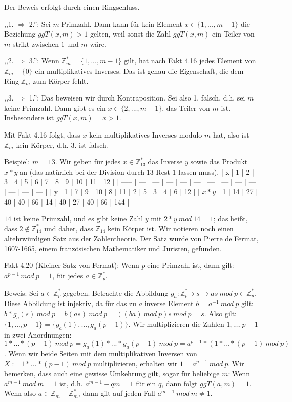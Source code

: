 \documentclass[a4paper]{article}
\begin{document}
\begin{multicols}{3}
    Der Beweis erfolgt durch einen Ringschluss.
    \begin{itemize*}
        \item ,,1. $\Rightarrow$ 2.'': Sei $m$ Primzahl. Dann kann für kein Element $x\in\{1 ,...,m-1\}$ die Beziehung $ggT(x,m)>1$ gelten, weil sonst die Zahl $ggT(x,m)$ ein Teiler von $m$ strikt zwischen $1$ und $m$ wäre.
        \item ,,2. $\Rightarrow$ 3.'': Wenn $\mathbb{Z}^*_m=\{1 ,...,m-1\}$ gilt, hat nach Fakt 4.16 jedes Element von $\mathbb{Z}_m -\{0\}$ ein multiplikatives Inverses. Das ist genau die Eigenschaft, die dem Ring $\mathbb{Z}_m$ zum Körper fehlt.
        \item ,,3. $\Rightarrow$ 1.'': Das beweisen wir durch Kontraposition. Sei also 1. falsch, d.h. sei $m$ keine Primzahl. Dann gibt es ein $x\in\{2,...,m-1\}$, das Teiler von $m$ ist. Insbesondere ist $ggT(x,m) =x >1$.
        \item Mit Fakt 4.16 folgt, dass $x$ kein multiplikatives Inverses modulo $m$ hat, also ist $\mathbb{Z}_m$ kein Körper, d.h. 3. ist falsch.
    \end{itemize*}

    Beispiel: $m=13$. Wir geben für jedes $x\in\mathbb{Z}^*_{13}$ das Inverse $y$ sowie das Produkt $x*y$ an (das natürlich bei der Division durch $13$ Rest $1$ lassen muss).
    | x     | 1   | 2   | 3   | 4   | 5   | 6   | 7   | 8   | 9   | 10  | 11  | 12  |
    | ----- | --- | --- | --- | --- | --- | --- | --- | --- | --- | --- | --- | --- |
    | y     | 1   | 7   | 9   | 10  | 8   | 11  | 2   | 5   | 3   | 4   | 6   | 12  |
    | $x*y$ | 1   | 14  | 27  | 40  | 40  | 66  | 14  | 40  | 27  | 40  | 66  | 144 |

    $14$ ist keine Primzahl, und es gibt keine Zahl $y$ mit $2*y\ mod\ 14 = 1$; das heißt, dass $2\not\in\mathbb{Z}^*_{14}$ und daher, dass $\mathbb{Z}_{14}$ kein Körper ist.
    Wir notieren noch einen altehrwürdigen Satz aus der Zahlentheorie. Der Satz wurde von Pierre de Fermat, 1607-1665, einem französischen Mathematiker und Juristen, gefunden.

    Fakt 4.20 (Kleiner Satz von Fermat): Wenn $p$ eine Primzahl ist, dann gilt: $a^{p-1}\ mod\ p= 1$, für jedes $a\in\mathbb{Z}^*_p$.

    Beweis: Sei $a\in\mathbb{Z}^*_p$ gegeben. Betrachte die Abbildung $g_a: \mathbb{Z}^*_p \owns s\rightarrow as\ mod\ p\in\mathbb{Z}^*_p$. Diese Abbildung ist injektiv, da für das zu $a$ inverse Element $b=a^{-1}\ mod\ p$ gilt: $b*g_a(s)\ mod\ p=b(as)\ mod\ p=((ba)\ mod\ p)s\ mod\ p=s$. Also gilt: $\{1,...,p-1\}=\{g_a(1),...,g_a(p-1)\}$.
    Wir multiplizieren die Zahlen $1,...,p-1$ in zwei Anordnungen: $1*...*(p-1)\ mod\ p =g_a(1) *...*g_a(p-1)\ mod\ p=a^{p-1} *(1*...*(p-1)\ mod\ p)$.
    Wenn wir beide Seiten mit dem multiplikativen Inversen von $X:= 1*...*(p-1)\ mod\ p$ multiplizieren, erhalten wir $1=a^{p-1}\ mod\ p$.
    Wir bemerken, dass auch eine gewisse Umkehrung gilt, sogar für beliebige $m$: Wenn $a^{m-1}\ mod\ m=1$ ist, d.h. $a^{m-1}-qm=1$ für ein $q$, dann folgt $ggT(a,m)=1$. Wenn also $a\in\mathbb{Z}_m -\mathbb{Z}^*_m$, dann gilt auf jeden Fall $a^{m-1}\ mod\ m\not= 1$.


\end{multicols}
\end{document}
